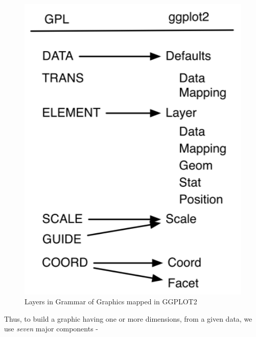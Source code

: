 \documentclass[
]{book}
\begin{document}
\begin{figure}

{\centering \includegraphics[width=5.25in,height=0.75\textheight]{images/layers_gg} 

}

\caption{Layers in Grammar of Graphics mapped in GGPLOT2}\label{fig:unnamed-chunk-238}
\end{figure}

Thus, to build a graphic having one or more dimensions, from a given data, we use \emph{seven} major components -
\end{document}
